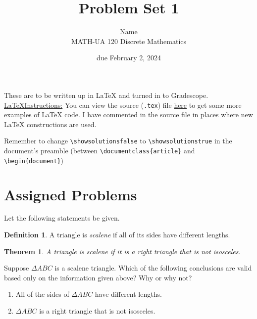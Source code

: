 \documentclass{article}
\title{Problem Set 1}
\author{%
    Name
\\  MATH-UA 120 Discrete Mathematics
}
\date{due February 2, 2024}
\newif\ifshowsolutions
\newcommand{\danger}{\marginpar[\hfill\dbend]{\dbend\hfill}}
\newtheorem*{theorem}{Theorem}
\theoremstyle{definition}
\newtheorem*{definition}{Definition}
\begin{document}
\maketitle



These are to be written up in \LaTeX{} and turned in to Gradescope.\\



\ifshowsolutions
    \SetupExSheets{solution/print=true}
\else
    \danger
 \underline{ \LaTeX  Instructions:}  You can view the source (\texttt{.tex}) file \href{https://bit.ly/4b8ddj8}{here} to get some more examples of \LaTeX{} code.  I have commented in the source file in places where new \LaTeX{} constructions are used.
  
  Remember to change \verb|\showsolutionsfalse| to \verb|\showsolutionstrue|
    in the document's preamble 
    (between \verb|\documentclass{article}| and \verb|\begin{document}|)
\fi

\section*{Assigned Problems}


\begin{question}{4}
    Let the following statements be given. 
       \begin{definition}
          A triangle is \emph{scalene} if all of its sides have different lengths.
       \end{definition}
       \begin{theorem}
          A triangle is scalene if it is a right triangle that is not isosceles.
       \end{theorem}
    Suppose $\Delta ABC$ is a scalene triangle. 
    Which of the following conclusions are valid based only on the information given above? 
    Why or why not?
    \begin{enumerate}
        \item All of the sides of $\Delta ABC$ have different lengths.
        \item $\Delta ABC$ is a right triangle that is not isosceles.
    \end{enumerate}
\end{question}
\begin{solution}
\end{solution}
\end{document}

